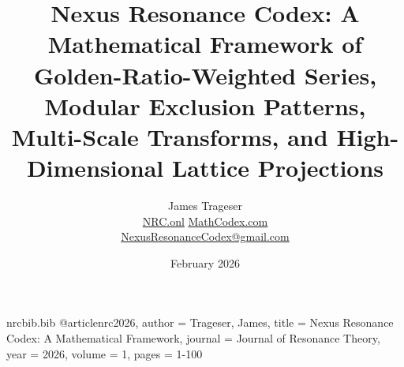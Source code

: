 \begin{filecontents}{nrcbib.bib}
@article{nrc2026,
  author = {Trageser, James},
  title = {Nexus Resonance Codex: A Mathematical Framework},
  journal = {Journal of Resonance Theory},
  year = {2026},
  volume = {1},
  pages = {1-100}
}
\end{filecontents}

\documentclass[11pt,a4paper]{article}

\usepackage[utf8]{inputenc}
\usepackage[T1]{fontenc}
\usepackage{lmodern}
\usepackage[english]{babel}
\usepackage{microtype}
\usepackage{amsmath,amssymb,amsthm,amsfonts,mathtools}
\usepackage[margin=1in]{geometry}
\usepackage{hyperref}
\usepackage{booktabs}
\usepackage{siunitx}
\usepackage{listings}
\usepackage{xcolor}
\usepackage{algorithm}
\usepackage{algorithmicx}
\usepackage{algpseudocode}
\usepackage{float}
\usepackage[most]{tcolorbox}
\usepackage{pgfplots}
\pgfplotsset{compat=1.18}
\usepackage{caption}
\usepackage{subcaption}
\usepackage{titlesec}
\usepackage{bookmark}
\usepackage{csquotes}
\usepackage{enumitem}
\usepackage[title]{appendix}

\usepackage{nrc}



\title{Nexus Resonance Codex: A Mathematical Framework of Golden-Ratio-Weighted Series, Modular Exclusion Patterns, Multi-Scale Transforms, and High-Dimensional Lattice Projections}

\author{James Trageser \\
        \href{https://NRC.onl}{NRC.onl} \quad \href{https://MathCodex.com}{MathCodex.com} \\
        \href{mailto:NexusResonanceCodex@gmail.com}{NexusResonanceCodex@gmail.com}}

\date{February 2026}



\maketitle

